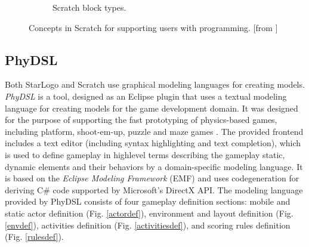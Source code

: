 \documentclass[runningheads,a4paper]{llncs}
\begin{document}
\begin{figure}[ht]
\begin{subfigure}[t]{0.9\textwidth}
\caption{Scratch block types.}\end{subfigure}
\caption{Concepts in Scratch for supporting users with programming. [from \cite{maloney2010scratch}]}
\end{figure}

  \subsection{PhyDSL}
  \label{subsection:PhyDSL}
  Both StarLogo and Scratch use graphical modeling languages for creating models. 
  \emph{PhyDSL} is a tool, designed as an Eclipse plugin that uses a textual modeling language for creating models for the game development domain.
  It was designed for the purpose of supporting the fast prototyping of physics-based games, including platform, shoot-em-up, 
  puzzle and maze games \cite{guana2014phydsl}. 
  The provided frontend includes a text editor (including syntax highlighting and text completion), which is used to define gameplay in highlevel
  terms describing the gameplay static, dynamic elements and their behaviors by a domain-specific modeling language.  
  It is based on the \emph{Eclipse Modeling Framework} \cite{gronback2009eclipse} (EMF) and uses codegeneration for deriving C\# code supported by Microsoft’s
  DirectX API. 
  The modeling language provided by PhyDSL consists of four gameplay definition sections: mobile and
  static actor definition (Fig. \ref{actordef}), 
  environment and layout definition (Fig. \ref{envdef}), 
  activities definition (Fig. \ref{activitiesdef}), 
  and scoring rules definition (Fig. \ref{rulesdef}).
  
\end{document}
